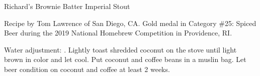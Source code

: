 \begin{recipe}{Richard's Brownie Batter Imperial Stout}

\begin{aboutblock}
Recipe by Tom Lawrence of San Diego, CA. Gold medal in Category \#25: Spiced
Beer during the 2019 National Homebrew Competition in Providence, RI. \sourceaha
\end{aboutblock}


\begin{methodandtiming}
 
\begin{mashsteps}
\end{mashsteps}

\begin{fermentationsteps}
\end{fermentationsteps}

\begin{directions}
Water adjustment: . Lightly toast shredded
coconut on the stove until light brown in color and let cool. Put coconut and
coffee beans in a muslin bag. Let beer condition on coconut and coffee at least
2 weeks.
\end{directions}

\end{methodandtiming}

\recipebreak

\begin{ingredientsblock}

\begin{malts}
\end{malts}

\begin{hops}
\end{hops}


\begin{twists}
\end{twists}

\end{ingredientsblock}

\end{recipe}
